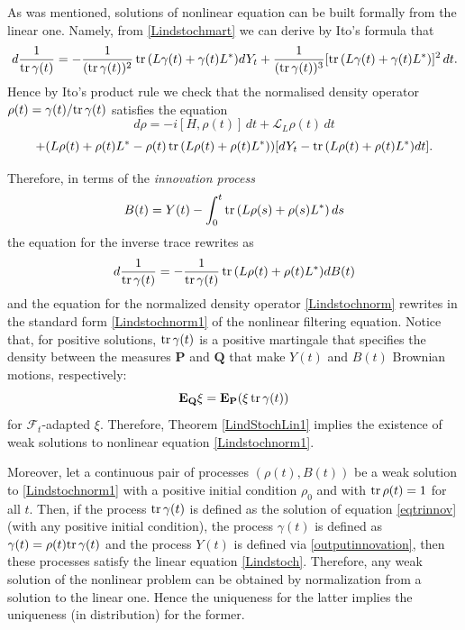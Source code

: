 \documentclass[12pt]{article}
\def\LC{\mathcal{L}}
\def\FC{\mathcal{F}}
\def\E{\mathbf{E}}
\def\P{\mathbf{P}}
\def\Q{\mathbf{Q}}
\def\tr{\rm{tr}}
\def\ga{\gamma}
\begin{document}
As was mentioned, solutions of nonlinear equation can be built
formally from the linear one. Namely, from \eqref{Lindstochmart}
we can derive by Ito's formula that
\[
d\frac{1}{{\tr} \, \ga(t)}=-\frac{1}{({\tr} \, \ga(t))^2} \, {\tr} \, (L\ga(t) +\ga(t) L^*) dY_t
+\frac{1}{({\tr} \, \ga(t))^3} [{\tr} \, (L\ga(t)+\ga(t) L^*)]^2 \, dt.
\]
Hence by Ito's product rule we check that the normalised density operator
$\rho(t)=\ga(t)/{\tr} \, \ga(t)$ satisfies the equation
 \[
d\rho=-i[H, \rho(t)] \, dt +\LC_L \rho(t)\, dt
\]
 \begin{equation}
\label{Lindstochnorm}
+(L\rho(t)+\rho(t) L^*-\rho(t)\, {\tr} \, (L\rho(t)+\rho(t) L^*) )
[dY_t-{\tr} \, (L\rho(t)+\rho(t) L^*) dt].
\end{equation}

Therefore, in terms of the {\it innovation process}
 \begin{equation}
\label{outputinnovation}
B(t)=Y(t)-\int_0^t {\tr} \, (L\rho(s)+\rho(s) L^*) \, ds
\end{equation}
 the equation for the inverse trace rewrites as
  \begin{equation}
\label{eqtrinnov}
d\frac{1}{{\tr} \, \ga(t)}
=-\frac{1}{{\tr} \, \ga(t)} \, {\tr} \, (L\rho(t) +\rho(t) L^*) dB(t)
\end{equation}
and the equation for the normalized density operator \eqref{Lindstochnorm} rewrites in the
standard form \eqref{Lindstochnorm1} of the nonlinear filtering equation.
 Notice that, for positive solutions, ${\tr} \, \ga(t)$ is a positive martingale
 that specifies the density between the measures $\P$ and $\Q$ that make $Y(t)$
 and $B(t)$ Brownian motions, respectively:
\[
\E_{\Q}\xi=\E_{\P}(\xi \, {\tr}\, \ga(t))
\]
for $\FC_t$-adapted $\xi$.
Therefore, Theorem \ref{LindStochLin1} implies the existence of
weak solutions to nonlinear equation \eqref{Lindstochnorm1}.

Moreover, let a continuous pair of processes $(\rho(t), B(t))$ be a
weak solution to \eqref{Lindstochnorm1} with a positive initial condition
$\rho_0$ and with ${\tr}\, \rho(t)=1$ for all $t$. Then,
if the process ${\tr }\, \ga(t)$ is defined as the solution of equation \eqref{eqtrinnov}
(with any positive initial condition), the process
$\ga(t)$ is defined as $\ga(t)= \rho(t) {\tr }\, \ga(t)$ and the process
$Y(t)$ is defined via \eqref{outputinnovation}, then these processes satisfy
the linear equation \eqref{Lindstoch}. Therefore, any weak solution of the
nonlinear problem can be obtained by normalization from a solution to the linear one.
Hence the uniqueness for the latter implies the uniqueness (in distribution) for the former.
\end{document}
